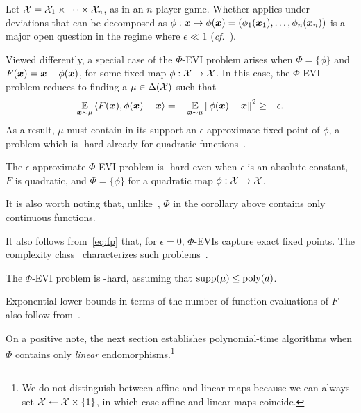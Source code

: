 \begin{remark}
    Let ${\mathcal{X}} = {\mathcal{X}}_1 \times \dots \times {\mathcal{X}}_n$, as in an $n$-player game. Whether  applies under deviations that can be decomposed as $\phi : {\bm{x}} \mapsto \phi({\bm{x}}) = (\phi_1({\bm{x}}_1), \dots, \phi_n({\bm{x}}_n))$ is a major open question in the regime where $\epsilon \ll 1$ (\emph{cf.}~\citealp{Dagan24:From,Peng24:Fast}).
\end{remark}

Viewed differently, a special case of the $\Phi$-EVI problem arises when $\Phi = \{ \phi \}$ and $F({\bm{x}}) = {\bm{x}} - \phi({\bm{x}})$, for some fixed map $\phi : {\mathcal{X}} \to {\mathcal{X}}$. In this case, the $\Phi$-EVI problem reduces to finding a $\mu \in \Delta({\mathcal{X}})$ such that
\begin{equation}
    \label{eq:fp}
    \E_{\vx\sim\mu} \ip{F(\vx), \phi(\vx) - \vx} = - \E_{\vx\sim\mu} \norm{\phi(\vx) - \vx}^2 \geq -\epsilon.
\end{equation}
As a result, $\mu$ must contain in its support an $\epsilon$-approximate fixed point of $\phi$, a problem which is \PPAD-hard already for quadratic functions~\citep{Zhang24:Efficient}.

\begin{corollary}
    \label{cor:hard-EVI-quad}
    The $\epsilon$-approximate $\Phi$-EVI problem is \PPAD-hard even when $\epsilon$ is an absolute constant, $F$ is quadratic, and $\Phi = \{ \phi \}$ for a quadratic map $\phi : {\mathcal{X}} \to {\mathcal{X}}$.
\end{corollary}

It is also worth noting that, unlike~, $\Phi$ in the corollary above contains only continuous functions.

It also follows from~\eqref{eq:fp} that, for $\epsilon = 0$, $\Phi$-EVIs capture exact fixed points. The complexity class \FIXP~characterizes such problems~\citep{Etessami07:Complexity}.

\begin{corollary}
    The $\Phi$-EVI problem is \FIXP-hard, assuming that $\operatorname{supp}(\mu) \leq \mathrm{poly}(d)$.
\end{corollary}

Exponential lower bounds in terms of the number of function evaluations of $F$ also follow from~\citet{Hirsch89:Exponential}.

On a positive note, the next section establishes polynomial-time algorithms when $\Phi$ contains only \emph{linear} endomorphisms.\footnote{We do not distinguish between affine and linear maps because we can always set ${\mathcal{X}} \gets {\mathcal{X}} \times \{1\}$, in which case affine and linear maps coincide.}